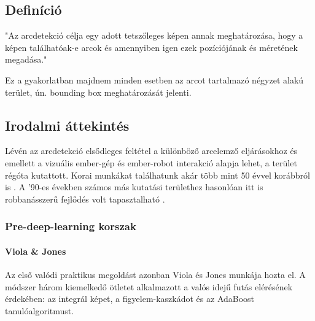 \subsection{Definíció}
"Az arcdetekció célja egy adott tetszőleges képen annak meghatározása, hogy a képen találhatóak-e arcok és amennyiben igen ezek pozíciójának és méretének megadása." \cite{yang_wider_2016} 

Ez a gyakorlatban majdnem minden esetben az arcot tartalmazó négyzet alakú terület, ún. bounding box meghatározását jelenti.

\subsection{Irodalmi áttekintés}
Lévén az arcdetekció elsődleges feltétel a különböző arcelemző eljárásokhoz és emellett a vizuális ember-gép és ember-robot interakció alapja lehet, a terület régóta kutattott. Korai munkákat találhatunk akár több mint 50 évvel korábbról is \cite{chan_man-machine_1965,sakai_computer_1972}. A '90-es években számos más kutatási területhez hasonlóan itt is robbanásszerű fejlődés volt tapasztalható \cite{yang_detecting_2002}.

\subsubsection*{Pre-deep-learning korszak}

\paragraph{Viola \& Jones}\hfill

Az első valódi praktikus megoldást azonban Viola és Jones \cite{viola_robust_2004} munkája hozta el. A módszer három kiemelkedő ötletet alkalmazott a valós idejű futás elérésének érdekében: az integrál képet, a figyelem-kaszkádot és az AdaBoost tanulóalgoritmust.

